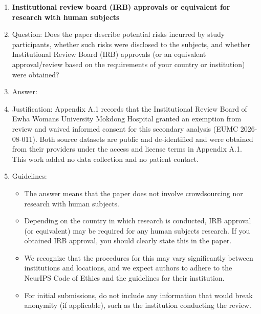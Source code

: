 \begin{enumerate}
\item {\bf Institutional review board (IRB) approvals or equivalent for research with human subjects}
    \item[] Question: Does the paper describe potential risks incurred by study participants, whether such risks were disclosed to the subjects, and whether Institutional Review Board (IRB) approvals (or an equivalent approval/review based on the requirements of your country or institution) were obtained?
    \item[] Answer: \answerYes{}
    \item[] Justification: Appendix A.1 records that the Institutional Review Board of Ewha Womans University Mokdong Hospital granted an exemption from review and waived informed consent for this secondary analysis (EUMC 2026-08-011). Both source datasets are public and de-identified and were obtained from their providers under the access and license terms in Appendix A.1. This work added no data collection and no patient contact.
    \item[] Guidelines:
    \begin{itemize}
        \item The answer \answerNA{} means that the paper does not involve crowdsourcing nor research with human subjects.
        \item Depending on the country in which research is conducted, IRB approval (or equivalent) may be required for any human subjects research. If you obtained IRB approval, you should clearly state this in the paper. 
        \item We recognize that the procedures for this may vary significantly between institutions and locations, and we expect authors to adhere to the NeurIPS Code of Ethics and the guidelines for their institution. 
        \item For initial submissions, do not include any information that would break anonymity (if applicable), such as the institution conducting the review.
    \end{itemize}


\end{enumerate}
